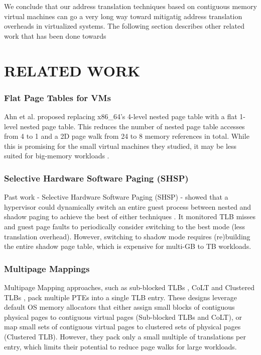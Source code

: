 \documentclass[sigconf]{sigplanconf}
\begin{document}
      We conclude that our address translation techniques based on contiguous memory virtual machines can go a very long way toward mitigatig address translation overheads in virtualized systems. The following section describes other related work that has been done towards 
       \section{RELATED WORK}
     \subsubsection{Flat Page Tables for VMs}
     Ahn et al.\cite{revisit} proposed replacing x86\_64's 4-level nested page table with a flat 1-level nested page table. This reduces the number of nested page table accesses from 4 to 1 and a 2D page walk from 24 to 8 memory references in total. While this is promising for the small virtual machines they studied, it may be less suited for big-memory workloads \cite{gandhi}.
     
     \subsubsection{Selective Hardware Software Paging (SHSP)}
     Past work - Selective Hardware Software Paging (SHSP) - showed that a hypervisor could dynamically switch an entire guest process between nested and shadow paging to achieve the best of either techniques \cite{gandhi101}. It monitored TLB misses and guest page faults to periodically consider switching to the best mode (less translation overhead). However, switching to shadow mode requires (re)building the entire shadow page table, which is expensive for multi-GB to TB workloads.
     
     \subsubsection{Multipage Mappings}
     Multipage Mapping approaches, such as sub-blocked TLBs \cite{gandhi96}, CoLT \cite{gandhi82} and Clustered TLBs \cite{gandhi81}, pack multiple PTEs into a single TLB entry. These designs leverage default OS memory allocators that either assign small blocks of contiguous physical pages to contiguous virtual pages (Sub-blocked TLBs and CoLT), or map small sets of contiguous virtual pages to clustered sets of physical pages (Clustered TLB). However, they pack only a small multiple of translations per entry, which limits their potential to reduce page walks for large workloads.
\end{document}
